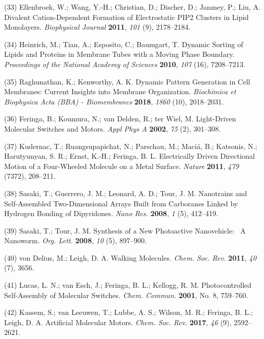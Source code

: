 \documentclass[11pt,notitlepage]{article}
\begin{document}
\leavevmode\hypertarget{ref-10CqL9t0a}{}%
(33) Ellenbroek, W.; Wang, Y.-H.; Christian, D.; Discher, D.; Janmey,
P.; Liu, A. Divalent Cation-Dependent Formation of Electrostatic PIP2
Clusters in Lipid Monolayers. \emph{Biophysical Journal} \textbf{2011},
\emph{101} (9), 2178--2184.

\leavevmode\hypertarget{ref-XIltXoGI}{}%
(34) Heinrich, M.; Tian, A.; Esposito, C.; Baumgart, T. Dynamic Sorting
of Lipids and Proteins in Membrane Tubes with a Moving Phase Boundary.
\emph{Proceedings of the National Academy of Sciences} \textbf{2010},
\emph{107} (16), 7208--7213.

\leavevmode\hypertarget{ref-2TfZ4zWV}{}%
(35) Raghunathan, K.; Kenworthy, A. K. Dynamic Pattern Generation in
Cell Membranes: Current Insights into Membrane Organization.
\emph{Biochimica et Biophysica Acta (BBA) - Biomembranes} \textbf{2018},
\emph{1860} (10), 2018--2031.

\leavevmode\hypertarget{ref-18PGyWtWV}{}%
(36) Feringa, B.; Koumura, N.; van Delden, R.; ter Wiel, M. Light-Driven
Molecular Switches and Motors. \emph{Appl Phys A} \textbf{2002},
\emph{75} (2), 301--308.

\leavevmode\hypertarget{ref-OAnfwOYX}{}%
(37) Kudernac, T.; Ruangsupapichat, N.; Parschau, M.; Maciá, B.;
Katsonis, N.; Harutyunyan, S. R.; Ernst, K.-H.; Feringa, B. L.
Electrically Driven Directional Motion of a Four-Wheeled Molecule on a
Metal Surface. \emph{Nature} \textbf{2011}, \emph{479} (7372), 208--211.

\leavevmode\hypertarget{ref-10MPrT2Vf}{}%
(38) Sasaki, T.; Guerrero, J. M.; Leonard, A. D.; Tour, J. M. Nanotrains
and Self-Assembled Two-Dimensional Arrays Built from Carboranes Linked
by Hydrogen Bonding of Dipyridones. \emph{Nano Res.} \textbf{2008},
\emph{1} (5), 412--419.

\leavevmode\hypertarget{ref-Tels98bO}{}%
(39) Sasaki, T.; Tour, J. M. Synthesis of a New Photoactive
Nanovehicle:~ A Nanoworm. \emph{Org. Lett.} \textbf{2008}, \emph{10}
(5), 897--900.

\leavevmode\hypertarget{ref-SfUEsk0e}{}%
(40) von Delius, M.; Leigh, D. A. Walking Molecules. \emph{Chem. Soc.
Rev.} \textbf{2011}, \emph{40} (7), 3656.

\leavevmode\hypertarget{ref-jCuccJLJ}{}%
(41) Lucas, L. N.; van Esch, J.; Feringa, B. L.; Kellogg, R. M.
Photocontrolled Self-Assembly of Molecular Switches. \emph{Chem.
Commun.} \textbf{2001}, No. 8, 759--760.

\leavevmode\hypertarget{ref-1H5r7SBir}{}%
(42) Kassem, S.; van Leeuwen, T.; Lubbe, A. S.; Wilson, M. R.; Feringa,
B. L.; Leigh, D. A. Artificial Molecular Motors. \emph{Chem. Soc. Rev.}
\textbf{2017}, \emph{46} (9), 2592--2621.
\end{document}
